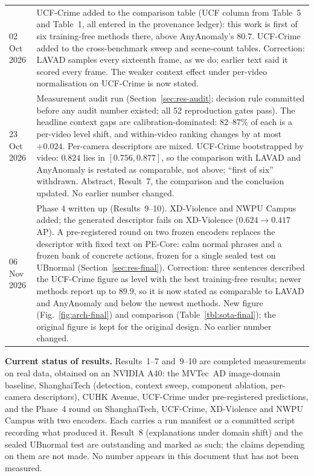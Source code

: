 \documentclass[a4paper,fleqn]{cas-sc}
\newcommand{\wnote}[1]{{\color{notecol}#1}}
\begin{document}
\begin{table}[width=\linewidth,cols=2,pos=h]
\begin{tabularx}{\linewidth}{@{}l Z@{}}
02 Oct 2026 & UCF-Crime added to the comparison table (UCF column from
         \citet{anyanomaly2025} Table~5 and \citet{zanella2024lavad} Table~1,
         all entered in the provenance ledger): this work is first of six
         training-free methods there, above AnyAnomaly's $80.7$. UCF-Crime added
         to the cross-benchmark sweep and scene-count tables. Correction: LAVAD
         samples every sixteenth frame, as we do; earlier text said it scored
         every frame. The weaker context effect under per-video normalisation
         on UCF-Crime is now stated. \\
23 Oct 2026 & Measurement audit run (Section~\ref{sec:res-audit}; decision rule
         committed before any audit number existed; all 52 reproduction gates
         pass). The headline context gaps are calibration-dominated: $82$--$87\%$
         of each is a per-video level shift, and within-video ranking changes by
         at most $+0.024$. Per-camera descriptors are mixed. UCF-Crime
         bootstrapped by video: $0.824$ lies in $[0.756, 0.877]$, so the
         comparison with LAVAD and AnyAnomaly is restated as comparable, not
         above; ``first of six'' withdrawn. Abstract, Result~7, the comparison
         and the conclusion updated. No earlier number changed. \\
06 Nov 2026 & Phase 4 written up (Results~9--10). XD-Violence and NWPU Campus
         added; the generated descriptor fails on XD-Violence ($0.624 \to
         0.417$ AP). A pre-registered round on two frozen encoders replaces the
         descriptor with fixed text on PE-Core: calm normal phrases and a frozen
         bank of concrete actions, frozen for a single sealed test on UBnormal
         (Section~\ref{sec:res-final}). Correction: three sentences described the
         UCF-Crime figure as level with the best training-free results; newer
         methods report up to $89.9$, so it is now stated as comparable to LAVAD
         and AnyAnomaly and below the newest methods. New figure
         (Fig.~\ref{fig:arch-final}) and comparison
         (Table~\ref{tbl:sota-final}); the original figure is kept for the
         original design. No earlier number changed. \\
\bottomrule
\end{tabularx}
\end{table}

\wnote{\textbf{Current status of results.} Results~1--7 and~9--10 are completed
measurements on real data, obtained on an NVIDIA A40: the MVTec~AD image-domain
baseline, ShanghaiTech (detection, context sweep, component ablation, per-camera
descriptors), CUHK Avenue, UCF-Crime under pre-registered predictions, and the
Phase~4 round on ShanghaiTech, UCF-Crime, XD-Violence and NWPU Campus with two
encoders. Each carries a run manifest or a committed script recording what
produced it. Result~8 (explanations under domain shift) and the sealed UBnormal
test are outstanding and marked as such; the claims depending on them are not
made. No number appears in this document that has not been measured.}
\end{document}

